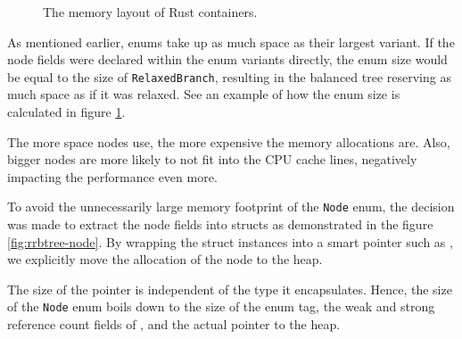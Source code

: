 \begin{figure}[!ht]

    \caption{The memory layout of Rust containers.}
    \label{fig:memory-layout-of-rust-containers}
\end{figure}

As mentioned earlier, enums take up as much space as their largest variant. If the node fields were declared within the enum variants directly, the enum size would be equal to the size of \texttt{RelaxedBranch}, resulting in the balanced tree reserving as much space as if it was relaxed. See an example of how the enum size is calculated in figure \ref{fig:memory-layout-of-rust-containers}.

The more space nodes use, the more expensive the memory allocations are. Also, bigger nodes are more likely to not fit into the CPU cache lines, negatively impacting the performance even more.

To avoid the unnecessarily large memory footprint of the \texttt{Node} enum, the decision was made to extract the node fields into structs as demonstrated in the figure \ref{fig:rrbtree-node}. By wrapping the struct instances into a smart pointer such as \rc{}, we explicitly move the allocation of the node to the heap.

The size of the \rc{} pointer is independent of the type it encapsulates. Hence, the size of the \texttt{Node} enum boils down to the size of the enum tag, the weak and strong reference count fields of \rc{}, and the actual pointer to the heap.

